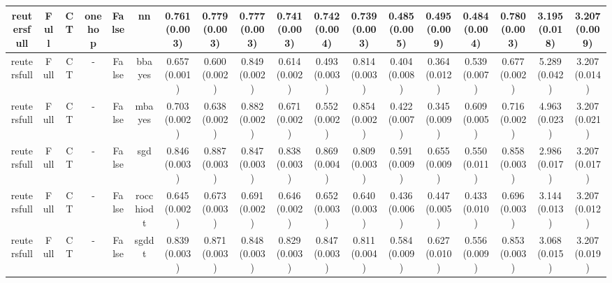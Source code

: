 \documentclass{article}
\begin{document}
{\begin{landscape}
\begin{table}[!h]
{\begin{tabular}{@{}cccccccccccccccccc@{}}
\midrule reutersfull & Full & CT & onehop & False & nn & 0.761 (0.003) & 0.779 (0.003) & 0.777 (0.003) & 0.741 (0.003) & 0.742 (0.004) & 0.739 (0.003) & 0.485 (0.005) & 0.495 (0.009) & 0.484 (0.004) &0.780 (0.003) & 3.195 (0.018) & 3.207 (0.009)\\
\midrule reutersfull & Full & CT & - & False & bbayes & 0.657 (0.001) & 0.600 (0.002) & 0.849 (0.002) & 0.614 (0.002) & 0.493 (0.003) & 0.814 (0.003) & 0.404 (0.008) & 0.364 (0.012) & 0.539 (0.007) &0.677 (0.002) & 5.289 (0.042) & 3.207 (0.014)\\
\midrule reutersfull & Full & CT & - & False & mbayes & 0.703 (0.002) & 0.638 (0.002) & 0.882 (0.002) & 0.671 (0.002) & 0.552 (0.002) & 0.854 (0.002) & 0.422 (0.007) & 0.345 (0.009) & 0.609 (0.005) &0.716 (0.002) & 4.963 (0.023) & 3.207 (0.021)\\
\midrule reutersfull & Full & CT & - & False & sgd & 0.846 (0.003) & 0.887 (0.003) & 0.847 (0.003) & 0.838 (0.003) & 0.869 (0.004) & 0.809 (0.003) & 0.591 (0.009) & 0.655 (0.009) & 0.550 (0.011) &0.858 (0.003) & 2.986 (0.017) & 3.207 (0.017)\\
\midrule reutersfull & Full & CT & - & False & rocchiodt & 0.645 (0.002) & 0.673 (0.003) & 0.691 (0.002) & 0.646 (0.002) & 0.652 (0.003) & 0.640 (0.003) & 0.436 (0.006) & 0.447 (0.005) & 0.433 (0.010) &0.696 (0.003) & 3.144 (0.013) & 3.207 (0.012)\\
\midrule reutersfull & Full & CT & - & False & sgddt & 0.839 (0.003) & 0.871 (0.003) & 0.848 (0.003) & 0.829 (0.003) & 0.847 (0.003) & 0.811 (0.004) & 0.584 (0.009) & 0.627 (0.010) & 0.556 (0.009) &0.853 (0.003) & 3.068 (0.015) & 3.207 (0.019)\\


\end{tabular}}
\end{table}
\end{landscape}}
\end{document}
